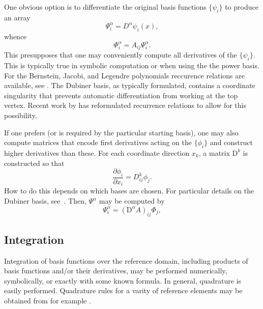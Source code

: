 One obvious option is to differentiate the
original basis functions \( \{ \psi_i \} \) to produce an array
\[
\Psi^\alpha_i = D^\alpha \psi_i(x),
\]
whence
\[
\Phi^\alpha_i = A_{ij} \Psi^\alpha_i.
\]
This presupposes that one may conveniently compute all derivatives of
the \( \{ \psi_i \} \).  This is typically true in symbolic
computation or when using the the power basis.  
For the Bernstein, Jacobi, and Legendre
 polynomials reccurence relations are
available, see \citep{KarniadakisSherwin2005,Kirby2010}.  
The Dubiner basis, as typically formulated, contains a coordinate
singularity that prevents automatic differentiation from working at
the top vertex.  Recent work by \citet{Kirby} has reformulated recurrence
relations to allow for this possibility.

If one prefers (or is required by the particular starting basis), one
may also compute matrices that encode first derivatives acting on the
\( \{ \phi_i \} \) and construct higher derivatives than these.
For each coordinate direction \( x_k \), a matrix \( \mathrm{D}^k \)
is constructed so that
\[
\frac{\partial \phi_i}{\partial x_i} =
D^k_{ij} \phi_j.
\]
How to do this depends on which bases are chosen.  For particular
details on the Dubiner basis, see~\citep{Dubiner1991}.  Then, \( \Psi^\alpha \)
may be computed by
\[
\Psi^\alpha_i = (\mathrm{D}^\alpha A)_{ij} \Phi_{j},
\]

\subsection{Integration}
Integration of basis functions over the reference domain, including products of
basis functions and/or their derivatives, may be performed numerically,
symbolically, or exactly with some known formula. 
In general, quadrature is easily performed. 
Quadrature rules for a varity of reference elements may 
be obtained from for example \citep{Dunavant1985,KeeganRidzalBochev2008,SolinSegethDolevzel2004}.


